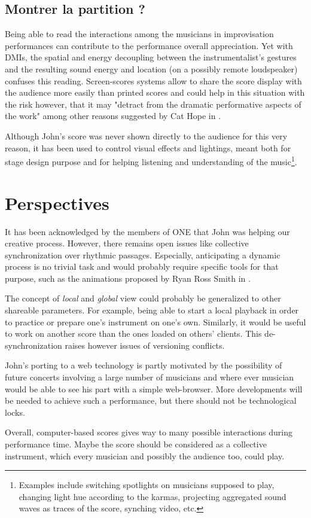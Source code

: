 \subsection{Montrer la partition ?}

Being able to read the interactions among the musicians in improvisation performances can contribute to the performance overall appreciation. Yet with \glspl{DMI}, the spatial and energy decoupling between the instrumentalist's gestures and the resulting sound energy and location (on a possibly remote loudspeaker) confuses this reading. Screen-scores systems allow to share the score display with the audience more easily than printed scores and could help in this situation with the risk however, that it may "detract from the dramatic performative aspects of the work" among other reasons suggested by Cat Hope in \cite{hope_screen_2011}. 

Although John's score was never shown directly to the audience for this very reason, it has been used to control visual effects and lightings, meant both for stage design purpose and for helping listening and understanding of the music\footnote{Examples include switching spotlights on musicians supposed to play, changing light hue according to the karmas, projecting aggregated sound waves as traces of the score, synching video, etc.}.

\section{Perspectives}

It has been acknowledged by the members of ONE that John was helping our creative process. However, there remains open issues like collective synchronization over rhythmic passages. Especially, anticipating a dynamic process is no trivial task and would probably require specific tools for that purpose, such as the animations proposed by Ryan Ross Smith in \cite{smith_atomic_2015}.

The concept of \textit{local} and \textit{global} view could probably be generalized to other shareable parameters. For example, being able to start a local playback in order to practice or prepare one's instrument on one's own. Similarly, it would be useful to work on another score than the ones loaded on others' clients. This de-synchronization raises however issues of versioning conflicts.

John's porting to a web technology is partly motivated by the possibility of future concerts involving a large number of musicians and where ever musician would be able to see his part with a simple web-browser. More developments will be needed to achieve such a performance, but there should not be technological locks.

Overall, computer-based scores gives way to many possible interactions during performance time. Maybe the score should be considered as a collective instrument,  which every musician and possibly the audience too, could play.

